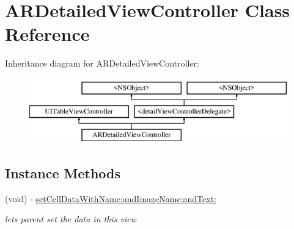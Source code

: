 \hypertarget{interface_a_r_detailed_view_controller}{\section{A\-R\-Detailed\-View\-Controller Class Reference}
\label{interface_a_r_detailed_view_controller}
}
Inheritance diagram for A\-R\-Detailed\-View\-Controller\-:\begin{figure}[H]
\begin{center}
\leavevmode
\includegraphics[height=2.828283cm]{interface_a_r_detailed_view_controller}
\end{center}
\end{figure}
\subsection*{Instance Methods}
\begin{DoxyCompactItemize}
\item 
(void) -\/ \hyperlink{interface_a_r_detailed_view_controller_a7db6bd35718ac78cf9d0ace37a65ff05}{set\-Cell\-Data\-With\-Name\-:and\-Image\-Name\-:and\-Text\-:}
\begin{DoxyCompactList}\small\item\em lets parent set the data in this view \end{DoxyCompactList}\end{DoxyCompactItemize}
